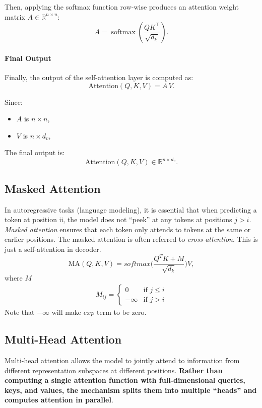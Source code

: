    Then, applying the softmax function row-wise produces an attention weight matrix \( A \in \mathbb{R}^{n \times n} \):
   \[
   A = \operatorname{softmax}\!\left(\frac{QK^\top}{\sqrt{d_k}}\right).
   \]

   \paragraph{Final Output}
   Finally, the output of the self-attention layer is computed as:
   \[
   \text{Attention}(Q, K, V) = A\,V.
   \]
   
   Since:
   \begin{itemize}
	   \item \( A \) is \( n \times n \),
	   \item \( V \) is \( n \times d_v \),
   \end{itemize}
   
   The final output is:
   \[
   \text{Attention}(Q, K, V) \in \mathbb{R}^{n \times d_v}.
   \]

\subsection{Masked Attention}
In autoregressive tasks (\eg language modeling), it is essential that when predicting a token at position ii, the model does not ``peek'' at any tokens at positions $j>i$. \textit{Masked attention} ensures that each token only attends to tokens at the same or earlier positions. The masked attention is often referred to \textit{cross-attention}. This is just a self-attention in decoder.
$$\textrm{MA}(Q,K,V) = softmax\bigg(\frac{Q^TK+M}{\sqrt{d_k}}\bigg)V,$$
where $M$ 
\begin{align*}
	M_{ij} = \begin{cases}
		0&\text{if } j\leq i\\
		-\infty&\text{if } j>i
	\end{cases}
\end{align*}
Note that $-\infty$ will make $exp$ term to be zero.

\subsection{Multi-Head Attention}
Multi-head attention allows the model to jointly attend to information from different representation subspaces at different positions. \textbf{Rather than computing a single attention function with full-dimensional queries, keys, and values, the mechanism splits them into multiple ``heads'' and computes attention in parallel}. 

